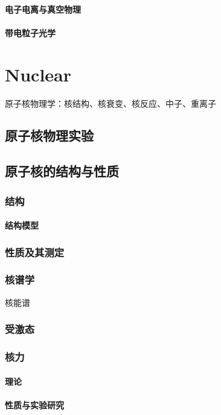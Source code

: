 \documentclass[UTF8]{../06-Physics}
\begin{document}
  \subsubsection{电子电离与真空物理}
  \subsubsection{带电粒子光学}




\chapter{Nuclear}
原子核物理学：核结构、核衰变、核反应、中子、重离子

\section{原子核物理实验}
\section{原子核的结构与性质}
    \subsection{结构}
        \subsubsection{结构模型}
    \subsection{性质及其测定}
    \subsection{核谱学}
    核能谱

    \subsection{受激态}
    \subsection{核力}
        \subsubsection{理论}
        \subsubsection{性质与实验研究}
\end{document}
